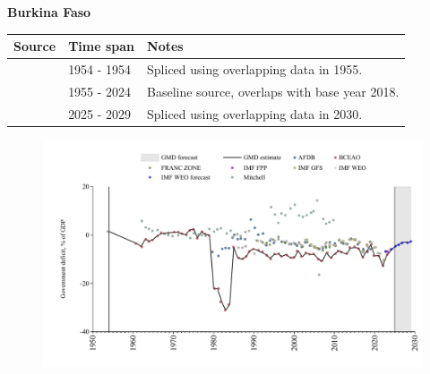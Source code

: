 \documentclass[12pt,a4paper,landscape]{article}
\begin{document}
\begin{adjustbox}{max totalsize={\paperwidth}{\paperheight},center}
\begin{minipage}[t][\textheight][t]{\textwidth}
\vspace*{0.5cm}
{}
\begin{center}
{\Large\bfseries Burkina Faso}
\end{center}
\vspace{0.5cm}
\begin{table}[H]
\centering
\small
\begin{tabular}{|l|l|l|}
\hline
\textbf{Source} & \textbf{Time span} & \textbf{Notes} \\
\hline
\rowcolor{white}\cite{Mitchell}& 1954 - 1954 &Spliced using overlapping data in 1955.\\
\rowcolor{lightgray}\cite{BCEAO}& 1955 - 2024 &Baseline source, overlaps with base year 2018.\\
\rowcolor{white}\cite{IMF_WEO_forecast}& 2025 - 2029 &Spliced using overlapping data in 2030.\\
\hline
\end{tabular}
\end{table}
\begin{figure}[H]
\centering
\includegraphics[width=\textwidth,height=0.6\textheight,keepaspectratio]{graphs/BFA_govdef_GDP.pdf}
\end{figure}
\end{minipage}
\end{adjustbox}
\end{document}
